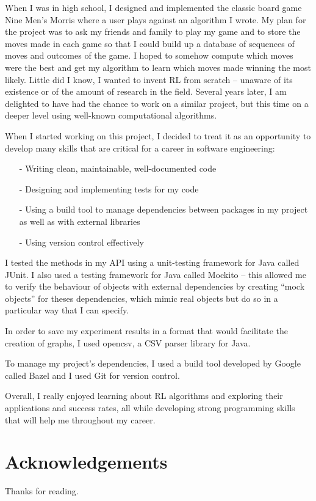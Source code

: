 \documentclass[11pt,a4paper]{report}
\begin{document}
When I was in high school, I designed and implemented the classic board game Nine Men’s Morris where a user plays against an algorithm I wrote. My plan for the project was to ask my friends and family to play my game and to store the moves made in each game so that I could build up a database of sequences of moves and outcomes of the game. I hoped to somehow compute which moves were the best and get my algorithm to learn which moves made winning the most likely. Little did I know, I wanted to invent RL from scratch – unaware of its existence or of the amount of research in the field. Several years later, I am delighted to have had the chance to work on a similar project, but this time on a deeper level using well-known computational algorithms.

When I started working on this project, I decided to treat it as an opportunity to develop many skills that are critical for a career in software engineering:

\begin{itemize}
	\item[-] Writing clean, maintainable, well-documented code
	\item[-]Designing and implementing tests for my code
	\item[-]Using a build tool to manage dependencies between packages in my project as well as with external libraries
	\item[-]Using version control effectively
\end{itemize}

I tested the methods in my API using a unit-testing framework for Java called JUnit. I also used a testing framework for Java called Mockito – this allowed me to verify the behaviour of objects with external dependencies by creating “mock objects” for theses dependencies, which mimic real objects but do so in a particular way that I can specify.

In order to save my experiment results in a format that would facilitate the creation of graphs, I used opencsv, a CSV parser library for Java.

To manage my project’s dependencies, I used a build tool developed by Google called Bazel and I used Git for version control.

Overall, I really enjoyed learning about RL algorithms and exploring their applications and success rates, all while developing strong programming skills that will help me throughout my career.


\chapter{Acknowledgements}

Thanks for reading.
\end{document}
